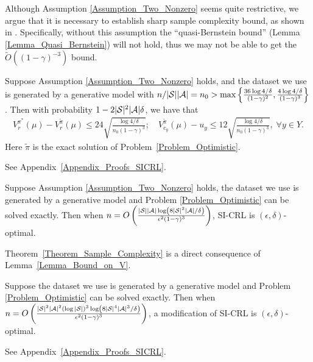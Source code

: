 Although Assumption \ref{Assumption_Two_Nonzero} seems quite restrictive, we argue that it is necessary to establish sharp sample complexity bound, as shown in \cite{LATTIMORE2014125}.
Specifically, without this assumption the ``quasi-Bernstein bound'' (Lemma \ref{Lemma_Quasi_Bernstein}) will not hold, thus we may not be able to get the $\widetilde O((1-\gamma)^{-3})$ bound.

\begin{lemma}\label{Lemma_Bound_on_V}
Suppose Assumption \ref{Assumption_Two_Nonzero} holds, and the dataset we use is generated by a generative model with $n/|{\mathcal{S}}||{\mathcal{A}}|=n_0>\max\left\{\frac{36\log4/\delta}{(1-\gamma)^2}, \frac{4\log4/\delta}{(1-\gamma)^3}\right\}$. Then with probability $1-2|{\mathcal{S}}|^2|{\mathcal{A}}|\delta$, we have that
$$\begin{aligned}
V_r^{\pi^*}(\mu)-V_r^{\tilde\pi}(\mu)\leq 24\sqrt{\frac{\log 4/\delta}{{n_0}(1-\gamma)^3}};\quad
V_{c_y}^{\tilde \pi}(\mu) - u_y \leq 12\sqrt{\frac{\log 4/\delta}{{n_0}(1-\gamma)^3}}, \; \forall y\in Y.
\end{aligned}
$$
Here $\tilde\pi$ is the exact solution of Problem~\ref{Problem_Optimistic}.
\end{lemma}
See Appendix~\ref{Appendix_Proofs_SICRL}.

\begin{theorem}\label{Theorem_Sample_Complexity}
Suppose Assumption \ref{Assumption_Two_Nonzero} holds, the dataset we use is generated by a generative model and Problem \ref{Problem_Optimistic} can be solved exactly. Then when $n=O\left(\frac{|{\mathcal{S}}||{\mathcal{A}}|\log \left({8|{\mathcal{S}}|^2|{\mathcal{A}}|/\delta}\right)}{\epsilon^2(1-\gamma)^3}\right)$, SI-CRL is $(\epsilon,\delta)$-optimal.
\end{theorem}
Theorem~\ref{Theorem_Sample_Complexity} is a direct consequence of Lemma~\ref{Lemma_Bound_on_V}.

\begin{theorem}\label{Theorem_Sample_Complexity_General}
Suppose the dataset we use is generated by a generative model and Problem \ref{Problem_Optimistic} can be solved exactly. Then when $n=O\left(\frac{|{\mathcal{S}}|^2|{\mathcal{A}}|^2\left({\log|{\mathcal{S}}|}\right)^3\log \left({8|{\mathcal{S}}|^4|{\mathcal{A}}|^3/\delta}\right)}{\epsilon^2(1-\gamma)^3}\right)$, a modification of SI-CRL is $(\epsilon,\delta)$-optimal.
\end{theorem}
See Appendix~\ref{Appendix_Proofs_SICRL}.


